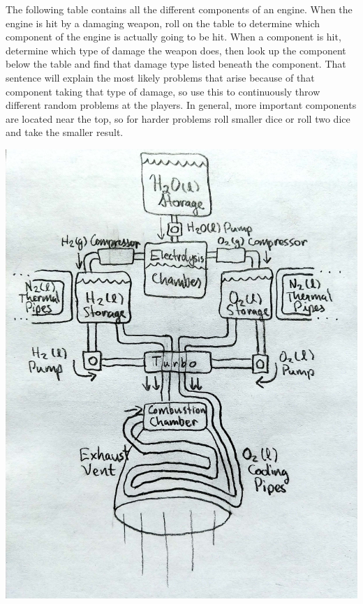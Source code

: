 \documentclass[a4paper]{article}
\begin{document}
The following table contains all the different components of an engine. When the engine is hit by a damaging weapon, roll on the table to determine which component of the engine is actually going to be hit. When a component is hit, determine which type of damage the weapon does, then look up the component below the table and find that damage type listed beneath the component. That sentence will explain the most likely problems that arise because of that component taking that type of damage, so use this to continuously throw different random problems at the players. In general, more important components are located near the top, so for harder problems roll smaller dice or roll two dice and take the smaller result. 

\vspace{0.2cm}
\includegraphics[scale=0.35]{Engine}
\end{document}
